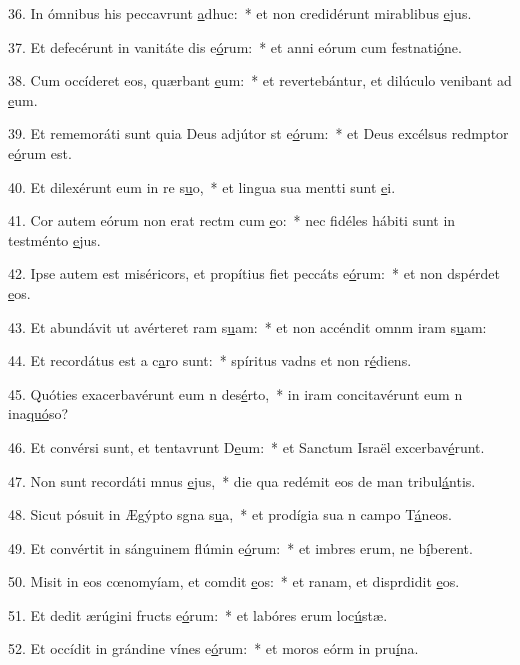 36. In ómnibus his peccavrunt \uline{a}dhuc:~* et non credidérunt mirablibus \uline{e}jus.\par 
37. Et defecérunt in vanitáte dis e\uline{ó}rum:~* et anni eórum cum festnati\uline{ó}ne.\par 
38. Cum occíderet eos, quærbant \uline{e}um:~* et revertebántur, et dilúculo venibant ad \uline{e}um.\par 
39. Et rememoráti sunt quia Deus adjútor st e\uline{ó}rum:~* et Deus excélsus redmptor e\uline{ó}rum est.\par 
40. Et dilexérunt eum in re s\uline{u}o,~* et lingua sua mentti sunt \uline{e}i.\par 
41. Cor autem eórum non erat rectm cum \uline{e}o:~* nec fidéles hábiti sunt in testménto \uline{e}jus.\par 
42. Ipse autem est miséricors, et propítius fiet peccáts e\uline{ó}rum:~* et non dspérdet \uline{e}os.\par 
43. Et abundávit ut avérteret ram s\uline{u}am:~* et non accéndit omnm iram s\uline{u}am:\par 
44. Et recordátus est a c\uline{a}ro sunt:~* spíritus vadns et non r\uline{é}diens.\par 
45. Quóties exacerbavérunt eum n des\uline{é}rto,~* in iram concitavérunt eum n ina\uline{quó}so?\par 
46. Et convérsi sunt, et tentavrunt D\uline{e}um:~* et Sanctum Israël excerbav\uline{é}runt.\par 
47. Non sunt recordáti mnus \uline{e}jus,~* die qua redémit eos de man tribul\uline{á}ntis.\par 
48. Sicut pósuit in Ægýpto sgna s\uline{u}a,~* et prodígia sua n campo T\uline{á}neos.\par 
49. Et convértit in sánguinem flúmin e\uline{ó}rum:~* et imbres erum, ne b\uline{í}berent.\par 
50. Misit in eos cœnomyíam, et comdit \uline{e}os:~* et ranam, et disprdidit \uline{e}os.\par 
51. Et dedit ærúgini fructs e\uline{ó}rum:~* et labóres erum loc\uline{ú}stæ.\par 
52. Et occídit in grándine vínes e\uline{ó}rum:~* et moros eórm in pru\uline{í}na.\par 
